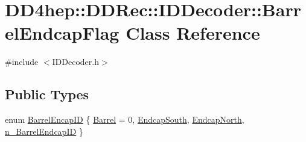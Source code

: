\hypertarget{class_d_d4hep_1_1_d_d_rec_1_1_i_d_decoder_1_1_barrel_endcap_flag}{
\section{DD4hep::DDRec::IDDecoder::BarrelEndcapFlag Class Reference}
\label{class_d_d4hep_1_1_d_d_rec_1_1_i_d_decoder_1_1_barrel_endcap_flag}
}


{\ttfamily \#include $<$IDDecoder.h$>$}\subsection*{Public Types}
\begin{DoxyCompactItemize}
\item 
enum \hyperlink{class_d_d4hep_1_1_d_d_rec_1_1_i_d_decoder_1_1_barrel_endcap_flag_acbdae4d36c49605ada531eddce7b60d8}{BarrelEncapID} \{ \hyperlink{class_d_d4hep_1_1_d_d_rec_1_1_i_d_decoder_1_1_barrel_endcap_flag_acbdae4d36c49605ada531eddce7b60d8aafbebf249136c9aee1824885ee80a419}{Barrel} = 0, 
\hyperlink{class_d_d4hep_1_1_d_d_rec_1_1_i_d_decoder_1_1_barrel_endcap_flag_acbdae4d36c49605ada531eddce7b60d8acd4918f139ed7b752c6959441b4f435d}{EndcapSouth}, 
\hyperlink{class_d_d4hep_1_1_d_d_rec_1_1_i_d_decoder_1_1_barrel_endcap_flag_acbdae4d36c49605ada531eddce7b60d8a49d61b44da3d6085afd4fbe6e97d5131}{EndcapNorth}, 
\hyperlink{class_d_d4hep_1_1_d_d_rec_1_1_i_d_decoder_1_1_barrel_endcap_flag_acbdae4d36c49605ada531eddce7b60d8afdede631cdf7cb28f6a1bb68d9ded732}{n\_\-BarrelEndcapID}
 \}
\end{DoxyCompactItemize}
